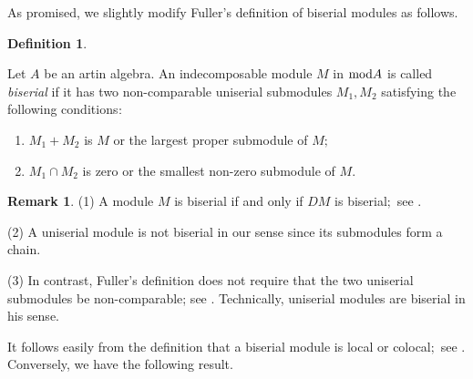 \documentclass[10pt]{amsart}
\theoremstyle{definition}
\newtheorem{Defn}[Theo]{Definition}
\newtheorem{Remark}[Theo]{Remark}
\newcommand{\mmod}{{\rm mod}}
\newcommand{\hp}{\hspace{.5pt}}
\begin{document}
\smallskip

As promised, we slightly modify Fuller's definition of biserial modules as follows. 

\begin{Defn}\label{bsm_def}

Let $A$ be an artin algebra. An indecomposable module $M$ in $\mmod A$ is called {\it biserial} if it has two non-comparable uniserial submodules $M_1, M_2$ satisfying the following conditions$\hp :$ 

\begin{enumerate}[$(1)$]

\vspace{-1.5pt}

\item $M_1+M_2$ is $M$ or the largest proper submodule of $M;$

\item $M_1\cap M_2$ is zero or the smallest non-zero submodule of $M.$

\end{enumerate}\end{Defn}


\begin{Remark}\label{rem_bsm} (1) A module $M$ is biserial if and only if $DM$ is biserial$;$
see \cite{Ful}. 

\noindent (2) A uniserial module is not biserial in our sense 
since its submodules form a chain.

\noindent (3) In contrast, Fuller's definition does not require that the two uniserial submodules be non-comparable; see \cite{Ful}. Technically, uniserial modules are biserial in his sense.

\end{Remark}

It follows easily from the definition that a biserial module is local or colocal$;$
see \cite{Ful}. Conversely, we have the following result.
\end{document}
